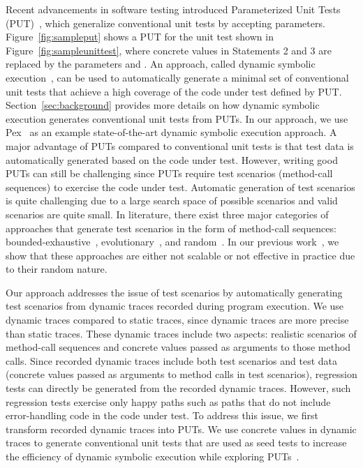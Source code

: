 Recent advancements in software testing introduced Parameterized
Unit Tests (PUT)~\cite{tillmann05:parameterized}, which generalize conventional unit tests 
by accepting parameters. Figure~\ref{fig:sampleput} shows a PUT for the unit
test shown in Figure~\ref{fig:sampleunittest}, where concrete values in Statements 2 and 3
are replaced by the parameters  and . An approach, called dynamic symbolic
execution~\cite{Clarke:symbolic, godefroid:dart, king:symex, koushik:cute},
can be used to automatically generate a minimal set of conventional unit tests
that achieve a high coverage of the code under test defined by PUT.
Section~\ref{sec:background} provides more details 
on how dynamic symbolic execution generates conventional unit tests from PUTs. 
In our approach, we use Pex~\cite{tillman:pexwhite} as an example state-of-the-art 
dynamic symbolic execution approach. A major advantage of PUTs compared to 
conventional unit tests is that test data is automatically
generated based on the code under test. However, writing good PUTs
can still be challenging since PUTs require test scenarios (method-call sequences) to exercise the code under test. 
Automatic generation of test scenarios is quite challenging due to a 
large search space of possible scenarios and valid scenarios are quite small.
In literature, there exist three major categories 
of approaches that generate test scenarios in the form of method-call sequences:
bounded-exhaustive~\cite{khurshid:symbolic, xie:rostra}, evolutionary~\cite{inkumsah08:improving, tonella:etoc}, 
and random~\cite{csallner:jcrasher, JTEST, pacheco:feedback}. In our previous
work~\cite{thummalapenta09:mseqgen}, we show that these approaches are either not scalable or not
effective in practice due to their random nature. 

Our approach addresses the issue of test scenarios by automatically generating test scenarios
from dynamic traces recorded during program execution. 
We use dynamic traces compared to static traces, since dynamic traces are more 
precise than static traces. These dynamic traces include two aspects: realistic scenarios
of method-call sequences and concrete values passed as arguments to those method calls.
Since recorded dynamic traces include both test scenarios and
test data (concrete values passed as arguments to method calls in test scenarios),
regression tests can directly be generated from the recorded dynamic traces.
However, such regression tests exercise only happy paths such
as paths that do not include error-handling code in the code under test.
To address this issue, we first transform recorded dynamic traces
into PUTs. We use concrete values in dynamic traces to generate
conventional unit tests that are used as seed tests to increase
the efficiency of dynamic symbolic execution while exploring PUTs~\cite{patrice08:whitebox}.

